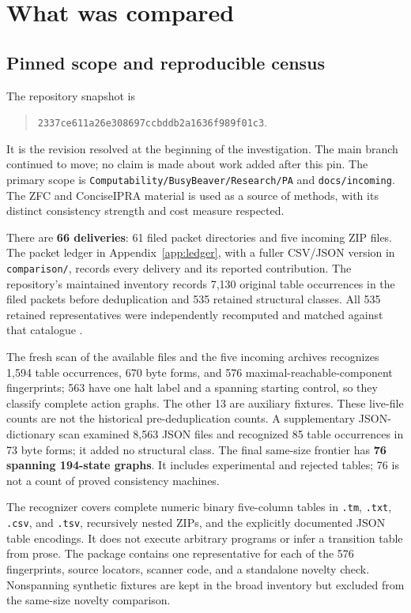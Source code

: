 \documentclass[11pt,letterpaper]{article}
\newcommand{\file}[1]{\begingroup\def\UrlBreaks{\do\/\do\_\do\-\do\.}\texttt{\nolinkurl{#1}}\endgroup}
\begin{document}
\section{What was compared}
\label{sec:comparison}

\subsection{Pinned scope and reproducible census}

The repository snapshot is
\begin{quote}\small
\file{2337ce611a26e308697ccbddb2a1636f989f01c3}.
\end{quote}
It is the revision resolved at the beginning of the investigation. The main
branch continued to move; no claim is made about work added after this pin.
The primary scope is \file{Computability/BusyBeaver/Research/PA} and
\file{docs/incoming}. The ZFC and ConciseIPRA material is used as a source of
methods, with its distinct consistency strength and cost measure respected.

There are \textbf{66 deliveries}: 61 filed packet directories and five incoming
ZIP files. The packet ledger in Appendix~\ref{app:ledger}, with a fuller CSV/JSON
version in \file{comparison/}, records every delivery and its reported contribution.
The repository's maintained inventory records 7,130 original table occurrences
in the filed packets before deduplication and 535 retained structural classes.
All 535 retained representatives were independently recomputed and matched
against that catalogue \cite{inventory}.

The fresh scan of the available files and the five incoming archives recognizes
1,594 table occurrences, 670 byte forms, and 576 maximal-reachable-component
fingerprints; 563 have one halt label and a spanning starting control, so they
classify complete action graphs. The other 13 are auxiliary fixtures. These
live-file counts are not the historical pre-deduplication counts. A supplementary
JSON-dictionary scan examined 8,563 JSON files and recognized 85 table occurrences
in 73 byte forms; it added no structural class. The final same-size frontier has
\textbf{76 spanning 194-state graphs}. It includes experimental and rejected tables;
76 is not a count of proved consistency machines.

The recognizer covers complete numeric binary five-column tables in
\file{.tm}, \file{.txt}, \file{.csv}, and \file{.tsv}, recursively nested ZIPs,
and the explicitly documented JSON table encodings. It does not execute arbitrary
programs or infer a transition table from prose. The package contains one
representative for each of the 576 fingerprints, source locators, scanner
code, and a standalone novelty check. Nonspanning synthetic fixtures are kept in
the broad inventory but excluded from the same-size novelty comparison.
\end{document}
